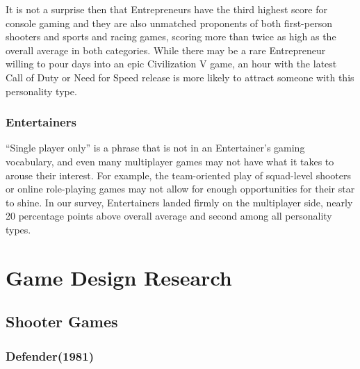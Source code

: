 \documentclass{article}
\begin{document}
It is not a surprise then that Entrepreneurs have the third highest score for console gaming and they are also unmatched proponents of both first-person shooters and sports and racing games, scoring more than twice as high as the overall average in both categories. While there may be a rare Entrepreneur willing to pour days into an epic Civilization V game, an hour with the latest Call of Duty or Need for Speed release is more likely to attract someone with this personality type.
\subsubsection{Entertainers}
“Single player only” is a phrase that is not in an Entertainer’s gaming vocabulary, and even many multiplayer games may not have what it takes to arouse their interest. For example, the team-oriented play of squad-level shooters or online role-playing games may not allow for enough opportunities for their star to shine. In our survey, Entertainers landed firmly on the multiplayer side, nearly 20 percentage points above overall average and second among all personality types.
\clearpage

\section{Game Design Research}

\subsection{Shooter Games}

\subsubsection{Defender(1981)}
\end{document}
